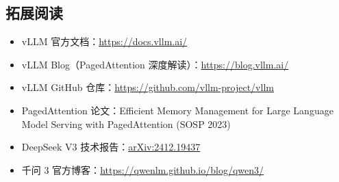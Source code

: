 \documentclass[a4paper]{article}
\begin{document}
\subsection{拓展阅读}

\begin{itemize}
    \item vLLM 官方文档：\href{https://docs.vllm.ai/}{https://docs.vllm.ai/}
    \item vLLM Blog（PagedAttention 深度解读）：\href{https://blog.vllm.ai/}{https://blog.vllm.ai/}
    \item vLLM GitHub 仓库：\href{https://github.com/vllm-project/vllm}{https://github.com/vllm-project/vllm}
    \item PagedAttention 论文：Efficient Memory Management for Large Language Model Serving with PagedAttention (SOSP 2023)
    \item DeepSeek V3 技术报告：\href{https://arxiv.org/abs/2412.19437}{arXiv:2412.19437}
    \item 千问 3 官方博客：\href{https://qwenlm.github.io/blog/qwen3/}{https://qwenlm.github.io/blog/qwen3/}
\end{itemize}
\end{document}
